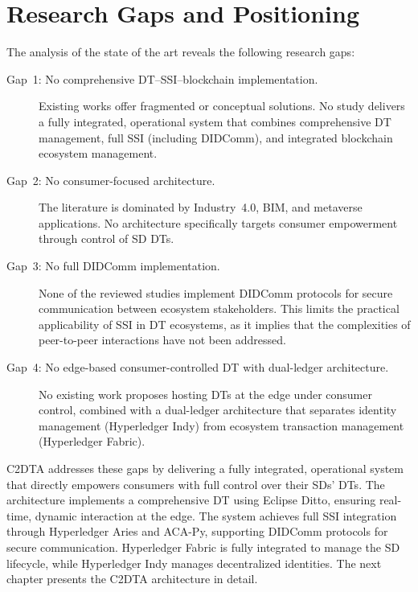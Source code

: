 \section{Research Gaps and Positioning}
\label{sec:gaps}

\noindent The analysis of the state of the art reveals the following research gaps:

\begin{description}
    \item[Gap~1: No comprehensive \ac{DT}--\ac{SSI}--blockchain implementation.] Existing works offer fragmented or conceptual solutions. No study delivers a fully integrated, operational system that combines comprehensive \ac{DT} management, full \ac{SSI} (including \ac{DIDComm}), and integrated blockchain ecosystem management.

    \item[Gap~2: No consumer-focused architecture.] The literature is dominated by Industry~4.0, BIM, and metaverse applications. No architecture specifically targets consumer empowerment through control of \ac{SD} \acp{DT}.

    \item[Gap~3: No full \ac{DIDComm} implementation.] None of the reviewed studies implement \ac{DIDComm} protocols for secure communication between ecosystem stakeholders. This limits the practical applicability of \ac{SSI} in \ac{DT} ecosystems, as it implies that the complexities of peer-to-peer interactions have not been addressed.

    \item[Gap~4: No edge-based consumer-controlled \ac{DT} with dual-ledger architecture.] No existing work proposes hosting \acp{DT} at the edge under consumer control, combined with a dual-ledger architecture that separates identity management (Hyperledger Indy) from ecosystem transaction management (Hyperledger Fabric).
\end{description}

\ac{C2DTA} addresses these gaps by delivering a fully integrated, operational system that directly empowers consumers with full control over their \acp{SD}' \acp{DT}.
The architecture implements a comprehensive \ac{DT} using Eclipse Ditto, ensuring real-time, dynamic interaction at the edge.
The system achieves full \ac{SSI} integration through Hyperledger Aries and ACA-Py, supporting \ac{DIDComm} protocols for secure communication.
Hyperledger Fabric is fully integrated to manage the \ac{SD} lifecycle, while Hyperledger Indy manages decentralized identities.
The next chapter presents the \ac{C2DTA} architecture in detail.
